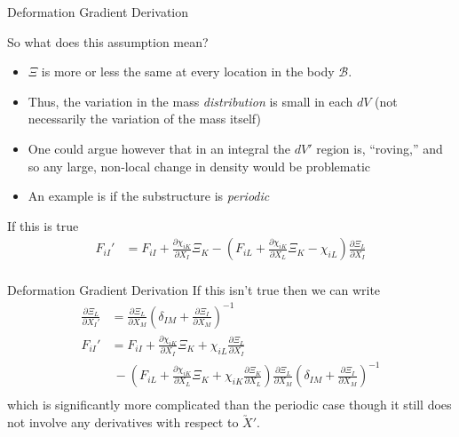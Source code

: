 \documentclass[11pt]{beamer}
\newcommand{\VEC}[1]{\utilde{#1}}
\begin{document}
\begin{frame}{Deformation Gradient Derivation}

So what does this assumption mean?

\begin{itemize}
\item $\Xi$ is more or less the same at every location in the body $\mathcal{B}$.
\item Thus, the variation in the mass \textit{distribution} is small in each $dV$ (not necessarily the variation of the mass itself)
\item One could argue however that in an integral the $dV'$ region is, ``roving,'' and so any large, non-local change in density would be problematic
\item An example is if the substructure is \textit{periodic}
\end{itemize}

If this is true
\begin{align*}
F_{iI}' &= F_{iI} + \frac{\partial \chi_{iK}}{\partial X_I} \Xi_K - \left(F_{iL} + \frac{\partial \chi_{iK}}{\partial X_L}\Xi_{K} - \chi_{iL}\right)\frac{\partial \Xi_L}{\partial X_I}\\
\end{align*}

\end{frame}

\begin{frame}{Deformation Gradient Derivation}
If this isn't true then we can write
\begin{align*}
\frac{\partial \Xi_L}{\partial X_I'} &= \frac{\partial \Xi_L}{\partial X_M} \left( \delta_{IM} + \frac{\partial \Xi_I}{\partial X_M}\right)^{-1}\\
F_{iI}' &= F_{iI} + \frac{\partial \chi_{iK}}{\partial X_I} \Xi_K + \chi_{iL}\frac{\partial \Xi_L}{\partial X_I}\\
&\ - \left(F_{iL} + \frac{\partial \chi_{iK}}{\partial X_L}\Xi_{K} + \chi_{iK} \frac{\partial \Xi_K}{\partial X_L}\right)\frac{\partial \Xi_L}{\partial X_M} \left( \delta_{IM} + \frac{\partial \Xi_I}{\partial X_M}\right)^{-1}\\
\end{align*}
which is significantly more complicated than the periodic case though it still does not involve any derivatives with respect to $\VEC{X}'$.
\end{frame}
\end{document}
